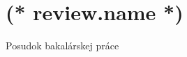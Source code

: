 \documentclass[12pt, twoside]{dgs}
\begin{document}
    \pagestyle{review}
    \section{(* review.name *)}
    {
        \centering\Large
        Posudok bakalárskej práce
    }
    
\end{document}
